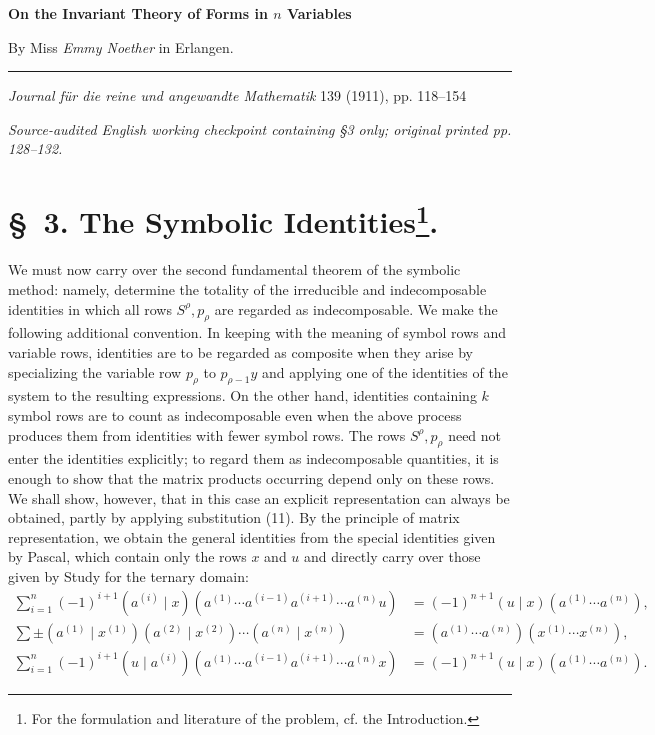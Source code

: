 \documentclass[10pt]{article}
\newcommand{\pair}[2]{(#1\mid #2)}
\begin{document}
\begin{center}
{\Large\bfseries On the Invariant Theory of Forms in $n$ Variables}\par
\vspace{0.5em}By Miss \emph{Emmy Noether} in Erlangen.\par
\medskip\rule{0.22\linewidth}{0.4pt}\par\vspace{0.7em}
\emph{Journal f\"ur die reine und angewandte Mathematik} 139 (1911), pp. 118--154\par\smallskip
{\small\itshape Source-audited English working checkpoint containing \S3 only; original printed pp. 128--132.}
\end{center}

\section*{\S\ 3. The Symbolic Identities\footnote{For the formulation and literature of the problem, cf. the Introduction.}.}

We must now carry over the second fundamental theorem of the symbolic method: namely, determine the totality of the irreducible and indecomposable identities in which all rows $S^\rho,p_\rho$ are regarded as indecomposable. We make the following additional convention. In keeping with the meaning of symbol rows and variable rows, identities are to be regarded as composite when they arise by specializing the variable row $p_\rho$ to $p_{\rho-1}y$ and applying one of the identities of the system to the resulting expressions. On the other hand, identities containing $k$ symbol rows are to count as indecomposable even when the above process produces them from identities with fewer symbol rows. The rows $S^\rho,p_\rho$ need not enter the identities explicitly; to regard them as indecomposable quantities, it is enough to show that the matrix products occurring depend only on these rows. We shall show, however, that in this case an explicit representation can always be obtained, partly by applying substitution (11). By the principle of matrix representation, we obtain the general identities from the special identities given by Pascal, which contain only the rows $x$ and $u$ and directly carry over those given by Study for the ternary domain:
\begin{align}
\sum_{i=1}^n(-1)^{i+1}\pair{a^{(i)}}{x}(a^{(1)}\cdots a^{(i-1)}a^{(i+1)}\cdots a^{(n)}u)&=(-1)^{n+1}\pair{u}{x}(a^{(1)}\cdots a^{(n)}),\tag{13}\\
\sum\pm\pair{a^{(1)}}{x^{(1)}}\pair{a^{(2)}}{x^{(2)}}\cdots\pair{a^{(n)}}{x^{(n)}}&=(a^{(1)}\cdots a^{(n)})(x^{(1)}\cdots x^{(n)}),\tag{14}\\
\sum_{i=1}^n(-1)^{i+1}\pair{u}{a^{(i)}}(a^{(1)}\cdots a^{(i-1)}a^{(i+1)}\cdots a^{(n)}x)&=(-1)^{n+1}\pair{u}{x}(a^{(1)}\cdots a^{(n)}).\tag{15}
\end{align}
\end{document}
